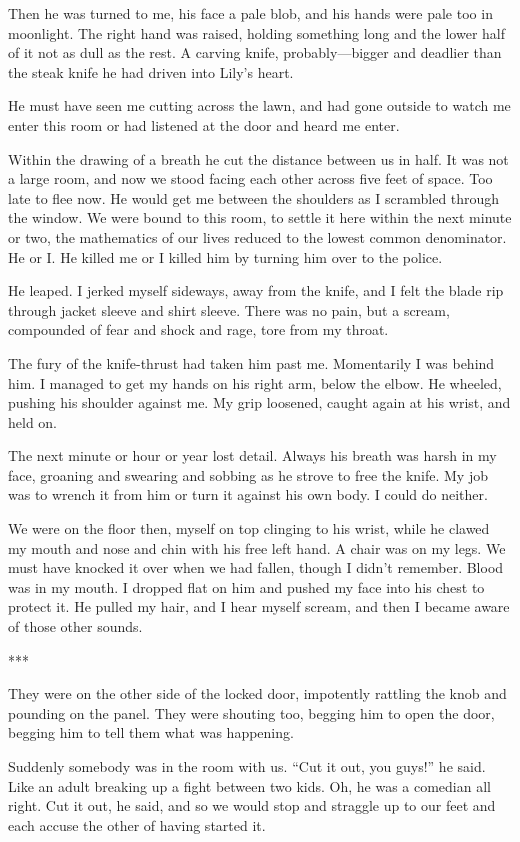\documentclass{novel}
\begin{document}
Then he was turned to me, his face a pale blob, and his hands were pale too in moonlight. The right hand was raised, holding something long and the lower half of it not as dull as the rest. A carving knife, probably—bigger and deadlier than the steak knife he had driven into Lily’s heart.

He must have seen me cutting across the lawn, and had gone outside to watch me enter this room or had listened at the door and heard me enter.

Within the drawing of a breath he cut the distance between us in half. It was not a large room, and now we stood facing each other across five feet of space. Too late to flee now. He would get me between the shoulders as I scrambled through the window. We were bound to this room, to settle it here within the next minute or two, the mathematics of our lives reduced to the lowest common denominator. He or I. He killed me or I killed him by turning him over to the police.

He leaped. I jerked myself sideways, away from the knife, and I felt the blade rip through jacket sleeve and shirt sleeve. There was no pain, but a scream, compounded of fear and shock and rage, tore from my throat.

The fury of the knife-thrust had taken him past me. Momentarily I was behind him. I managed to get my hands on his right arm, below the elbow. He wheeled, pushing his shoulder against me. My grip loosened, caught again at his wrist, and held on.

The next minute or hour or year lost detail. Always his breath was harsh in my face, groaning and swearing and sobbing as he strove to free the knife. My job was to wrench it from him or turn it against his own body. I could do neither.

We were on the floor then, myself on top clinging to his wrist, while he clawed my mouth and nose and chin with his free left hand. A chair was on my legs. We must have knocked it over when we had fallen, though I didn’t remember. Blood was in my mouth. I dropped flat on him and pushed my face into his chest to protect it. He pulled my hair, and I hear myself scream, and then I became aware of those other sounds.

***

They were on the other side of the locked door, impotently rattling the knob and pounding on the panel. They were shouting too, begging him to open the door, begging him to tell them what was happening.

Suddenly somebody was in the room with us. “Cut it out, you guys!” he said. Like an adult breaking up a fight between two kids. Oh, he was a comedian all right. Cut it out, he said, and so we would stop and straggle up to our feet and each accuse the other of having started it.
\end{document}
